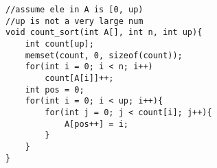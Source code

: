     
\begin{lstlisting}
//assume ele in A is [0, up)
//up is not a very large num
void count_sort(int A[], int n, int up){
	int count[up];
	memset(count, 0, sizeof(count));
	for(int i = 0; i < n; i++)
		count[A[i]]++;
	int pos = 0;
	for(int i = 0; i < up; i++){
		for(int j = 0; j < count[i]; j++){
			A[pos++] = i;
		}
	}
}
\end{lstlisting}
